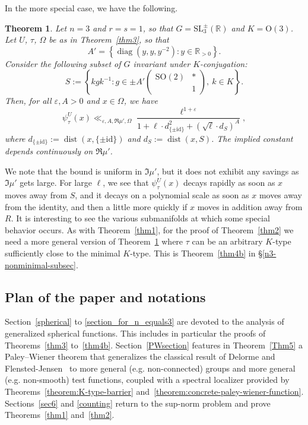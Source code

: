 \documentclass[11pt,oneside]{amsart}
\numberwithin{equation}{section}
\theoremstyle{remark}
\theoremstyle{plain}
\newtheorem{theorem}{Theorem}
\DeclareMathOperator{\diag}{diag}
\DeclareMathOperator{\dist}{dist}
\newcommand\SL{\mathrm{SL}}
\newcommand\OO{\mathrm{O}}
\newcommand\SO{\mathrm{SO}}
\newcommand\id{\mathrm{id}}
\newcommand\RR{\mathbb{R}}
\newcommand\eps{\varepsilon}
\begin{document}
In the more special case, we have the following.

\begin{theorem}\label{thm4} Let $n=3$ and $r=s=1$, so that $G=\SL_3^\pm(\RR)$ and $K=\OO(3)$. Let $U$, $\tau$, $\Omega$ be as in Theorem~\ref{thm3}, so that
\[
A'=\left\{\diag(y,y,y^{-2}):y\in\RR_{>0}\right\}.
\]
Consider the following subset of $G$ invariant under $K$-conjugation:
\[
S := \left\{ k g k^{-1} : g\in \pm A' \begin{pmatrix} \SO(2) & \ast \\& 1 \end{pmatrix},\ k\in K \right\}.
\]
Then, for all $\eps,A>0$ and $x\in\Omega$, we have
\[\psi^{U}_{\tau} (x)\ll_{\eps, A,\Re\mu',\Omega}
\frac{\ell^{1+\eps}}{1 + \ell \cdot d_{\{\pm\id\}}^2+ (\sqrt{\ell} \cdot d_S)^A}, \]
where $d_{\{\pm\id\}}:=\dist(x,\{\pm\id\})$ and $d_S:=\dist(x,S)$. The implied constant depends continuously on $\Re\mu'$.
\end{theorem}

We note that the bound is uniform in $\Im\mu'$, but it does not exhibit any savings as $\Im\mu'$ gets large. For large $\ell$, we see that $\psi^{U}_{\tau}(x)$ decays rapidly as soon as $x$ moves away from $S$, and it decays on a polynomial scale as soon as $x$ moves away from the identity, and then a little more quickly if $x$ moves in addition away from $R$. It is interesting to see the various submanifolds at which some special behavior occurs. As with Theorem~\ref{thm1}, for the proof of Theorem~\ref{thm2} we need a more general version of Theorem~\ref{thm4} where $\tau$ can be an arbitrary $K$-type sufficiently close to the minimal $K$-type. This is Theorem~\ref{thm4b} in \S\ref{n3-nonminimal-subsec}.

\subsection{Plan of the paper and notations}\label{subsec:notations}
Section~\ref{spherical} to \ref{section_for_n_equals3} are devoted to the analysis of generalized spherical functions. This includes in particular the proofs of Theorems~\ref{thm3} to~\ref{thm4b}. Section~\ref{PWsection} features in Theorem~\ref{Thm5} a Paley--Wiener theorem that generalizes the classical result of Delorme and Flensted-Jensen~\cite[Th.~2]{DFJ} to more general (e.g. non-connected) groups and more general (e.g. non-smooth) test functions, coupled with a spectral localizer provided by Theorems~\ref{theorem:K-type-barrier} and~\ref{theorem:concrete-paley-wiener-function}. Sections~\ref{sec6} and \ref{counting} return to the sup-norm problem and prove Theorems~\ref{thm1} and~\ref{thm2}. 
\end{document}
